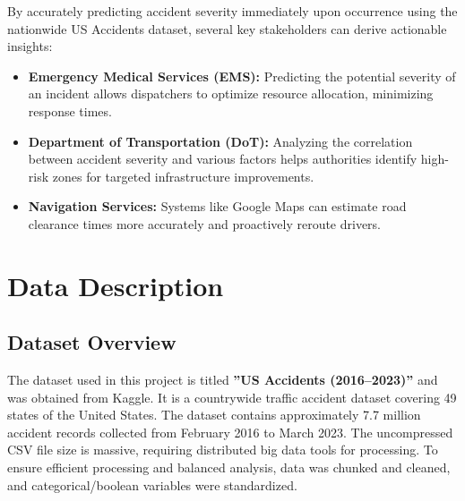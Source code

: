 \documentclass[11pt,a4paper]{article}
\begin{document}
By accurately predicting accident severity immediately upon occurrence using the nationwide US Accidents dataset, several key stakeholders can derive actionable insights:
\begin{itemize}
    \item \textbf{Emergency Medical Services (EMS):} Predicting the potential severity of an incident allows dispatchers to optimize resource allocation, minimizing response times.
    \item \textbf{Department of Transportation (DoT):} Analyzing the correlation between accident severity and various factors helps authorities identify high-risk zones for targeted infrastructure improvements.
    \item \textbf{Navigation Services:} Systems like Google Maps can estimate road clearance times more accurately and proactively reroute drivers.
\end{itemize}


\section{Data Description}

\subsection*{Dataset Overview}
The dataset used in this project is titled \textbf{”US Accidents (2016--2023)”} and was obtained from Kaggle. It is a countrywide traffic accident dataset covering 49 states of the United States. The dataset contains approximately 7.7 million accident records collected from February 2016 to March 2023. The uncompressed CSV file size is massive, requiring distributed big data tools for processing. To ensure efficient processing and balanced analysis, data was chunked and cleaned, and categorical/boolean variables were standardized.
\end{document}
